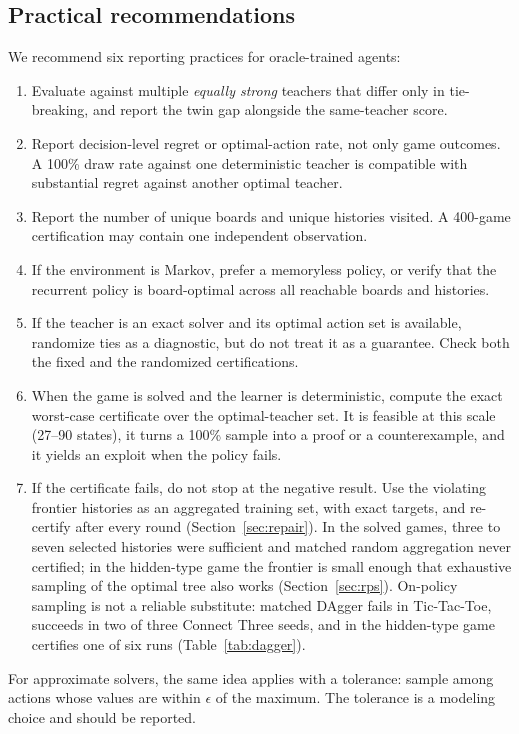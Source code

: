 \documentclass[conference]{IEEEtran}
\begin{document}
\subsection{Practical recommendations}
We recommend six reporting practices for oracle-trained agents:
\begin{enumerate}
\item Evaluate against multiple \emph{equally strong} teachers that differ only in tie-breaking, and report the twin gap alongside the same-teacher score.
\item Report decision-level regret or optimal-action rate, not only game outcomes. A 100\% draw rate against one deterministic teacher is compatible with substantial regret against another optimal teacher.
\item Report the number of unique boards and unique histories visited. A 400-game certification may contain one independent observation.
\item If the environment is Markov, prefer a memoryless policy, or verify that the recurrent policy is board-optimal across all reachable boards and histories.
\item If the teacher is an exact solver and its optimal action set is available, randomize ties as a diagnostic, but do not treat it as a guarantee. Check both the fixed and the randomized certifications.
\item When the game is solved and the learner is deterministic, compute the exact worst-case certificate over the optimal-teacher set. It is feasible at this scale (27--90 states), it turns a 100\% sample into a proof or a counterexample, and it yields an exploit when the policy fails.
\item If the certificate fails, do not stop at the negative result. Use the violating frontier histories as an aggregated training set, with exact targets, and re-certify after every round (Section~\ref{sec:repair}). In the solved games, three to seven selected histories were sufficient and matched random aggregation never certified; in the hidden-type game the frontier is small enough that exhaustive sampling of the optimal tree also works (Section~\ref{sec:rps}). On-policy sampling is not a reliable substitute: matched DAgger fails in Tic-Tac-Toe, succeeds in two of three Connect Three seeds, and in the hidden-type game certifies one of six runs (Table~\ref{tab:dagger}).
\end{enumerate}
For approximate solvers, the same idea applies with a tolerance: sample among actions whose values are within $\epsilon$ of the maximum. The tolerance is a modeling choice and should be reported.
\end{document}
